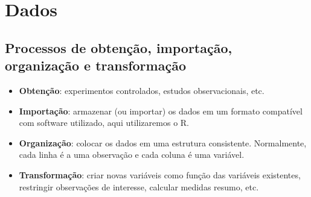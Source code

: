 \documentclass[
]{book}
\providecommand{\tightlist}{%
  \setlength{\itemsep}{0pt}\setlength{\parskip}{0pt}}
\begin{document}
\chapter{Dados}\label{dados_4}

\section{Processos de obtenção, importação, organização e transformação}\label{processos-de-obtenuxe7uxe3o-importauxe7uxe3o-organizauxe7uxe3o-e-transformauxe7uxe3o}

\begin{itemize}
\tightlist
\item
  \textbf{Obtenção}: experimentos controlados, estudos observacionais, etc.
\item
  \textbf{Importação}: armazenar (ou importar) os dados em um formato compatível com software utilizado, aqui utilizaremos o R.
\item
  \textbf{Organização}: colocar os dados em uma estrutura consistente. Normalmente, cada linha é a uma observação e cada coluna é uma variável.
\item
  \textbf{Transformação}: criar novas variáveis como função das variáveis existentes, restringir observações de interesse, calcular medidas resumo, etc.
\end{itemize}
\end{document}

